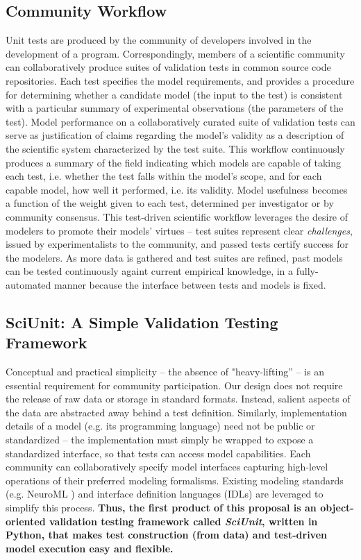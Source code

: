 \documentclass[11pt,letterpaper]{article}
\begin{document}
\subsection{Community Workflow}
Unit tests are produced by the community of developers involved in the development of a program. Correspondingly, members of a scientific community can collaboratively produce suites of validation tests in common source code repositories. Each test specifies the model requirements, and provides a procedure for determining whether a candidate model (the input to the test) is consistent with a particular summary of experimental observations (the parameters of the test). Model performance on a collaboratively curated suite of validation tests can serve as justification of claims regarding the model's validity as a description of the scientific system characterized by the test suite. This workflow continuously produces a summary of the field indicating which models are capable of taking each test, i.e. whether the test falls within the model's scope, and for each capable model, how well it performed, i.e. its validity.  Model usefulness becomes a function of the weight given to each test, determined per investigator or by community consensus. This test-driven scientific workflow leverages the desire of modelers to promote their models' virtues -- test suites represent clear \emph{challenges}, issued by experimentalists to the community, and passed tests certify success for the modelers. As more data is gathered and test suites are refined, past models can be tested continuously againt current empirical knowledge, in a fully-automated manner because the interface between tests and models is fixed.  

\subsection{SciUnit: A Simple Validation Testing Framework}
Conceptual and practical simplicity -- the absence of "heavy-lifting'' -- is an essential requirement for community participation. Our design does not require the release of raw data or storage in standard formats. Instead, salient aspects of the data are abstracted away behind a test definition. Similarly, implementation details of a model (e.g. its programming language) need not be public or standardized -- the implementation must simply be wrapped to expose a standardized interface, so that tests can access model capabilities. Each community can collaboratively specify model interfaces capturing high-level operations of their preferred modeling formalisms. Existing modeling standards (e.g. NeuroML \cite{neuroml_url,gleeson_neuroml:_2010}) and interface definition languages (IDLs) \cite{bachmann2008} are leveraged to simplify this process. \textbf{Thus, the first product of this proposal is an object-oriented validation testing framework called \textit{SciUnit}, written in Python, that makes test construction (from data) and test-driven model execution easy and flexible.} 
\end{document}
